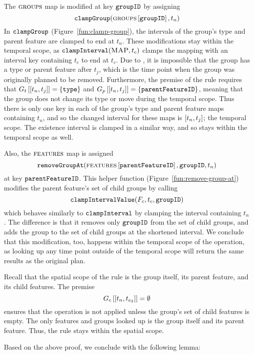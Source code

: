    The $\textsc{groups}{}{}$ map is modified at key $\texttt{groupID}$ by assigning 
   $$\texttt{clampGroup}(\textsc{groups}{} \left[ \texttt{groupID} \right], t_n)$$
   In $\texttt{clampGroup}$ (Figure~\vref{fun:clamp-group}), the intervals of the group's type and parent feature are clamped to end at $t_n$. These modifications stay within the temporal scope, as $\texttt{clampInterval}(\textsc{MAP}, t_c)$ clamps the mapping with an interval key containing $t_c$ to end at $t_c$. Due to , it is impossible that the group has a type or parent feature after $t_j$, which is the time point when the group was originally planned to be removed. Furthermore, the premise of the rule requires that $\lookup{G_t}{\interval{t_n}{t_j}} = \set{\var{type}}$ and $\lookup{G_p}{\interval{t_n}{t_j}} = \set{\var{parentFeatureID}}$, meaning that the group does not change its type or move during the temporal scope. Thus there is only one key in each of the group's type and parent feature maps containing $t_n$, and so the changed interval for these maps is $\interval{t_n}{t_j}$; the temporal scope. The existence interval is clamped in a similar way, and so stays within the temporal scope as well.

   Also, the $\textsc{features}{}$ map is assigned $$\texttt{removeGroupAt}(\textsc{features} \left[ \texttt{parentFeatureID} \right], \texttt{groupID}, t_n)$$ at key $\texttt{parentFeatureID}$. This helper function (Figure~\vref{fun:remove-group-at}) modifies the parent feature's set of child groups by calling 
   $$\texttt{clampIntervalValue}(F_c, t_c, \texttt{groupID})$$
   which behaves similarly to $\texttt{clampInterval}$ by clamping the interval containing $t_n$. The difference is that it removes only $\texttt{groupID}$ from the set of child groups, and adds the group to the set of child groups at the shortened interval. We conclude that this modification, too, happens within the temporal scope of the operation, as looking up any time point outside of the temporal scope will return the same results as the original plan.

   Recall that the spatial scope of the rule is the group itself, its parent feature, and its child features. The premise
\begin{equation*}
   \lookup{G_c}{\interval{t_n}{t_{e_2}}} = \emptyset
\end{equation*}
   ensures that the operation is not applied unless the group's set of child features is empty. The only features and groups looked up is the group itself and its parent feature. Thus, the rule stays within the spatial scope.

Based on the above proof, we conclude with the following lemma:
 \\

